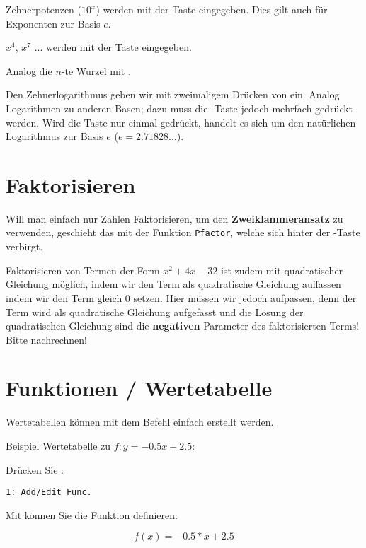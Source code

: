 Zehnerpotenzen ($10^x$) werden mit der Taste  eingegeben. Dies gilt auch für Exponenten zur Basis $e$.

$x^4$, $x^7$ ... werden mit der Taste  eingegeben.

Analog die $n$-te Wurzel mit .

Den Zehnerlogarithmus geben wir mit zweimaligem Drücken
von   ein. Analog Logarithmen zu anderen
Basen; dazu muss die -Taste jedoch mehrfach gedrückt
werden.
Wird die Taste  nur einmal gedrückt, handelt es sich um
den natürlichen Logarithmus zur Basis $e$ ($e = 2.71828...$).



\section{Faktorisieren}\label{faktorisieren}


Will man einfach nur Zahlen Faktorisieren, \zB um den \textbf{Zweiklammeransatz} zu verwenden, geschieht das mit der Funktion \texttt{Pfactor}, welche sich hinter der -Taste verbirgt.

Faktorisieren von Termen der Form $x^2 +4x -32$ ist zudem mit
quadratischer Gleichung möglich, indem wir den Term als quadratische
Gleichung auffassen indem wir den Term gleich 0 setzen. Hier müssen wir jedoch aufpassen, denn der Term wird als quadratische Gleichung aufgefasst und die Lösung der quadratischen Gleichung sind die \textbf{negativen} Parameter des faktorisierten Terms! Bitte nachrechnen!
\newpage

\section{Funktionen / Wertetabelle}\label{wertetabelle}
Wertetabellen können mit dem Befehl  einfach erstellt
werden.

Beispiel Wertetabelle zu $f: y=-0.5x + 2.5$:

Drücken Sie :

\texttt{1: Add/Edit Func.}

Mit  können Sie die Funktion definieren:

$$f(x) = -0.5 * x + 2.5$$

